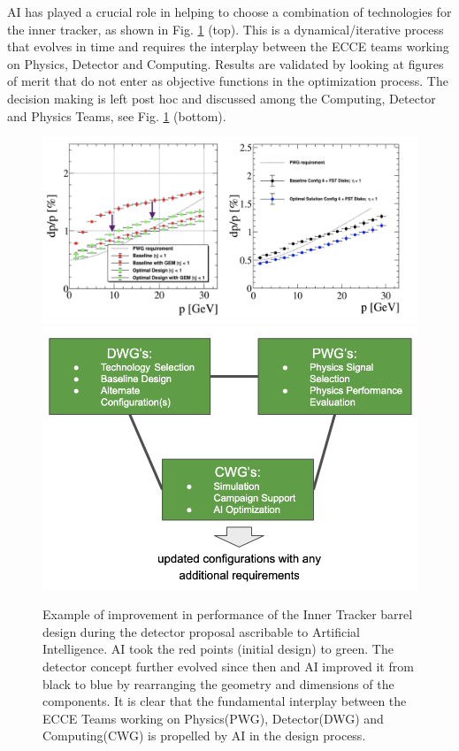AI has played a crucial role in helping to choose a combination of technologies for the inner tracker, as shown in Fig. \ref{fig:improved_with_AI} (top). 
This is a dynamical/iterative process that evolves in time and requires the interplay between the ECCE teams working on Physics, Detector and Computing.
Results are validated by looking at figures of merit that do not enter as objective functions in the optimization process. The decision making is left post hoc and discussed among the Computing, Detector and Physics Teams, see Fig. \ref{fig:improved_with_AI} (bottom).



\begin{figure}[!]
    \centering
    \includegraphics[scale = 0.26]{figs/improve_with_AI.png}
    \includegraphics[scale = 0.36]{figs/interplay.png}
    \caption{
    Example of improvement in performance of the Inner Tracker barrel design during the detector proposal ascribable to Artificial Intelligence. AI took the red points (initial design) to green. The detector concept further evolved since then and AI improved it from black to blue by rearranging the geometry and dimensions of the components. It is clear that the fundamental interplay between the ECCE Teams working on Physics(PWG), Detector(DWG) and Computing(CWG) is propelled by AI in the design process. 
}
    \label{fig:improved_with_AI}
\end{figure}

